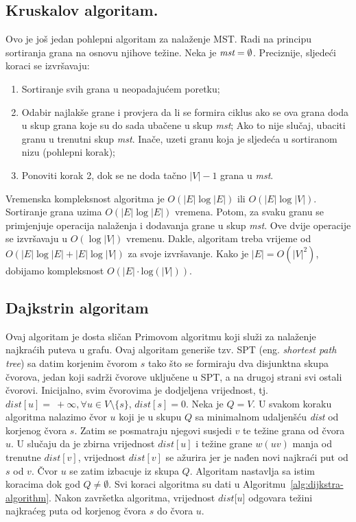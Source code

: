 \documentclass[a4paper, utf8, 11pt, colorlinks]{book}
\begin{document}
\subsection{Kruskalov algoritam.}

Ovo je još jedan pohlepni algoritam za nalaženje MST. Radi na principu sortiranja 
grana na osnovu njihove težine. Neka je $\emph{mst} = \emptyset$. Preciznije, sljedeći koraci se izvršavaju:

\begin{enumerate}
	\item Sortiranje svih grana u neopadajućem poretku;
	\item Odabir najlakše grane i provjera da li se formira ciklus ako se ova 
	grana doda u skup grana koje su do sada ubačene u skup \emph{mst}; Ako to nije slučaj, ubaciti granu u trenutni skup \emph{mst}. Inače, uzeti granu koja je sljedeća u sortiranom nizu (pohlepni korak);
	\item Ponoviti korak 2, dok se ne doda tačno $|V|-1$ grana u \emph{mst}.
\end{enumerate} 

\noindent Vremenska kompleksnost algoritma je $O(|E|\log |E|)$ ili $O(|E|\log |V|)$. Sortiranje grana uzima $O(|E| \log|E|)$ vremena. Potom, za svaku granu 
se primjenjuje operacija nalaženja i dodavanja grane u skup \emph{mst}. Ove dvije operacije se izvršavaju u $O(\log |V|)$ vremenu. Dakle, algoritam treba vrijeme od $O(|E|\log |E| + |E|\log |V|)$ za svoje izvršavanje. Kako je $|E|=O(|V|^2)$, dobijamo kompleksnost $O(|E| \cdot \mathrm{log}(|V|))$. 

\subsection{Dajkstrin algoritam}

Ovaj algoritam je dosta sličan Primovom algoritmu koji služi za nalaženje najkraćih puteva u grafu. Ovaj algoritam generiše tzv. SPT (eng. \emph{shortest path tree}) sa datim korjenim čvorom $s$ tako  što se formiraju dva disjunktna skupa čvorova, jedan koji sadrži čvorove uključene u SPT, a na drugoj strani svi ostali čvorovi. Inicijalno, svim čvorovima je dodjeljena vrijednost, tj. $dist[u]=\ +\infty, \forall u \in V\setminus \{s\}$, $dist[s]=0$. Neka je $Q = V$. 
U svakom koraku algoritma nalazimo čvor $u$ koji je u skupu $Q$ sa minimalnom udaljenšću \emph{dist} od korjenog čvora $s$. Zatim se posmatraju njegovi susjedi $v$ te težine grana od čvora $u$. U slučaju da je zbirna vrijednost $dist[u]$  i težine grane $w(uv)$ manja od trenutne $dist[v]$, vrijednost $dist[v]$ se ažurira jer je nađen novi najkraći put od $s$ od $v$.  Čvor $u$ se zatim izbacuje iz skupa $Q$. Algoritam nastavlja sa istim koracima dok god $Q \neq \emptyset$. 
Svi koraci algoritma su dati u Algoritmu~\ref{alg:dijkstra-algorithm}. Nakon završetka algoritma, vrijednost $dist$[$u$] odgovara težini najkraćeg puta od korjenog čvora $s$ do čvora $u$. 
\end{document}
